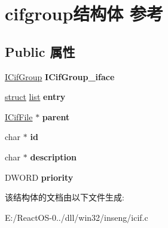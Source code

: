\hypertarget{structcifgroup}{}\section{cifgroup结构体 参考}
\label{structcifgroup}
\subsection*{Public 属性}
\begin{DoxyCompactItemize}
\item 
\mbox{\label{structcifgroup_a9def4fc4fe975c8bcfbe46c297fa501f}} 
\hyperlink{interface_i_cif_group}{I\+Cif\+Group} {\bfseries I\+Cif\+Group\+\_\+iface}
\item 
\mbox{\label{structcifgroup_a813b2340506ce04fb5c9fa524901dd73}} 
\hyperlink{interfacestruct}{struct} \hyperlink{classlist}{list} {\bfseries entry}
\item 
\mbox{\label{structcifgroup_a00ce1a1d16b3a33b91503bc3d428a640}} 
\hyperlink{interface_i_cif_file}{I\+Cif\+File} $\ast$ {\bfseries parent}
\item 
\mbox{\label{structcifgroup_a781514bb5885b16b9c815a6d51d85c2d}} 
char $\ast$ {\bfseries id}
\item 
\mbox{\label{structcifgroup_a4584b8d33c2043a40d11fa93380155b5}} 
char $\ast$ {\bfseries description}
\item 
\mbox{\label{structcifgroup_aec664dd799da38cea4ebb2f1cdf6fb33}} 
D\+W\+O\+RD {\bfseries priority}
\end{DoxyCompactItemize}


该结构体的文档由以下文件生成\+:\begin{DoxyCompactItemize}
\item 
E\+:/\+React\+O\+S-\/0../dll/win32/inseng/icif.\+c\end{DoxyCompactItemize}
